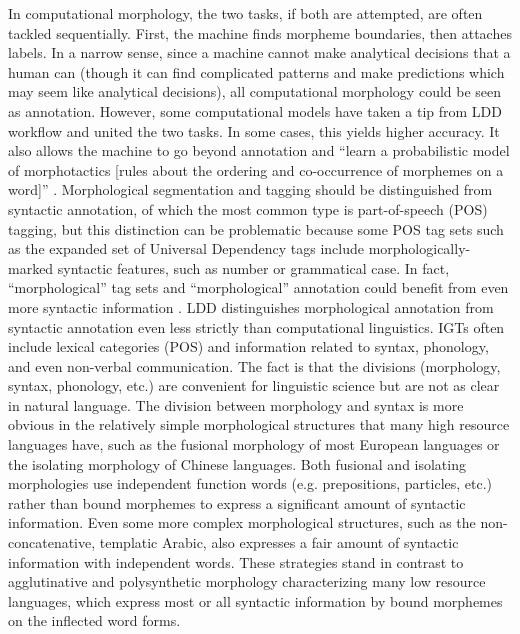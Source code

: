 \documentclass[12pt]{article}
\begin{document}
In computational morphology, the two tasks, if both are attempted, are often tackled sequentially. First, the machine finds morpheme boundaries, then attaches labels. In a narrow sense, since a machine cannot make analytical decisions that a human can (though it can find complicated patterns and make predictions which may seem like analytical decisions), all computational morphology could be seen as annotation. However, some computational models have taken a tip from LDD workflow and united the two tasks. In some cases, this yields higher accuracy. It also allows the machine to go beyond annotation and ``learn a probabilistic model of morphotactics [rules about the ordering and co-occurrence of morphemes on a word]'' \cite[page 165]{cotterell_labeled_2015}.
Morphological segmentation and tagging should be distinguished from syntactic annotation, of which the most common type is part-of-speech (POS) tagging, but this distinction can be problematic because some POS tag sets such as the expanded set of Universal Dependency tags \cite{de_marneffe_universal_2014} include morphologically-marked syntactic features, such as number or grammatical case. In fact, ``morphological'' tag sets and ``morphological'' annotation could benefit from even more syntactic information \cite{cotterell_cross-lingual_2017}. LDD distinguishes morphological annotation from syntactic annotation even less strictly than computational linguistics. IGTs often include lexical categories (POS) and information related to syntax, phonology, and even non-verbal communication. The fact is that the divisions (morphology, syntax, phonology, etc.) are convenient for linguistic science but are not as clear in natural language. The division between morphology and syntax is more obvious in the relatively simple morphological structures that many high resource languages have, such as the fusional morphology of most European languages or the isolating morphology of Chinese languages. Both fusional and isolating morphologies use independent function words (e.g. prepositions, particles, etc.) rather than bound morphemes to express a significant amount of syntactic information. Even some more complex morphological structures, such as the non-concatenative, templatic Arabic, also expresses a fair amount of syntactic information with independent words. These strategies stand in contrast to agglutinative and polysynthetic morphology characterizing many low resource languages, which express most or all syntactic information by bound morphemes on the inflected word forms. 
\end{document}
